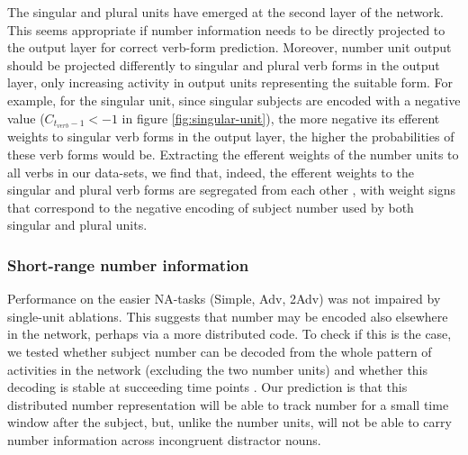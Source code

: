 The singular and plural units have emerged at the second layer of the network. This seems appropriate if number information needs to be directly projected to the output layer for correct verb-form prediction. Moreover, number unit output should be projected differently to singular and plural verb forms in the output layer, only increasing activity in output units representing the suitable form. For example, for the singular unit, since singular subjects are encoded with a negative value ($C_{t_{verb}-1}<-1$ in figure \ref{fig:singular-unit}), the more negative its efferent weights to singular verb forms in the output layer, the higher the probabilities of these verb forms would be. Extracting the efferent weights of the number units to all verbs in our data-sets, we find that, indeed, the efferent weights to the singular and plural verb forms are segregated from each other , with weight signs that correspond to the negative encoding of subject number used by both singular and plural units.

\subsubsection{Short-range number information}
Performance on the easier NA-tasks (Simple, Adv, 2Adv) was not
impaired by single-unit ablations. This suggests that number may be
encoded also elsewhere in the network, perhaps via a more distributed
code. To check if this is the case, we tested whether subject number
can be decoded from the whole pattern of activities in the network
(excluding the two number units) and whether this decoding is stable
at succeeding time points \cite[see][for similar observations and
related methods]{Giulianelli:etal:2018}. Our prediction is that this
distributed number representation will be able to track number for a
small time window after the subject, but, unlike the number units,
will not be able to carry number information across incongruent
distractor nouns.

